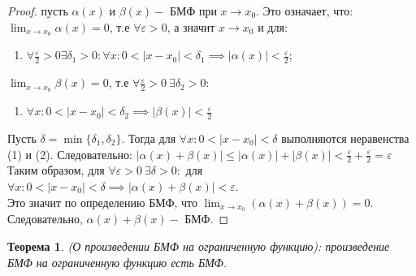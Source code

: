 \documentclass[12pt, a4paper]{article}
\newtheorem{theorem}{Теорема}[subsection]
\theoremstyle{remark}
\newcommand{\Y}{\mathbb{\forall}}
\newcommand{\F}{\mathbb{\exists}}
\newcommand{\E}{\mathbb{\varepsilon}}
\begin{document}
	\begin{proof}
		пусть $\alpha(x)$ и $\beta(x) -$ БМФ при $x \to x_0$. Это означает, что: 
		\\
		
		\(\lim_{x \to x_0} \alpha(x) = 0\), т.е \(\Y\E > 0\), а значит $x \to x_0$ и для:
		
		\begin{enumerate}[label=(\arabic*), start = 1]
			\item $\Y\frac{\E}{2} > 0 \F\delta_1 > 0: \Y x: 0 < |x - x_0| < \delta_1 \implies |\alpha(x)| < \frac{\E}{2}$;
		\end{enumerate}
		
		\(\lim_{x \to x_0} \beta(x) = 0\), т.е $\Y\frac{\E}{2} > 0 \ \F\delta_2 > 0$:
		
		\begin{enumerate}[label=(\arabic*), start = 2]
			\item \(\Y x: 0 < |x - x_0| < \delta_2 \implies |\beta(x)| < \frac{\E}{2}\)
		\end{enumerate}
		
		Пусть \(\delta = \min\{\delta_1, \delta_2\}\). Тогда для $\Y x: 0 < |x - x_0| < \delta$ выполняются неравенства (1) и (2). Следовательно: \(|\alpha(x) + \beta(x)| \leq |\alpha(x)| + |\beta(x)| < \frac{\E}{2} + \frac{\E}{2} = \E\)
		\\
		
		Таким образом, для $\Y\E > 0 \ \F\delta > 0:$ для $\Y x: 0 < |x - x_0| < \delta \implies |\alpha(x) + \beta(x)| < \E$.
		\\
		
		Это значит по определению БМФ, что \(\lim_{x \to x_0} (\alpha(x) + \beta(x)) = 0\). Следовательно, $\alpha(x) + \beta(x) -$ БМФ.
	\end{proof}
	
	\begin{theorem}
		(О произведении БМФ на ограниченную функцию): произведение БМФ на ограниченную функцию есть БМФ.
	\end{theorem}
	
\end{document}
